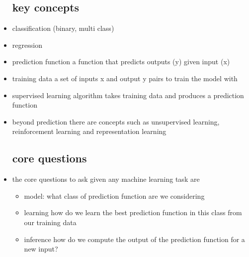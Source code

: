 \documentclass{article}
\begin{document}
\begin{itemize}
\subsection{key concepts}
\item classification (binary, multi class)
\item regression
\item prediction function a function that predicts outputs (y) given input (x)
\item training data a set of inputs x and output y pairs to train the model with
\item supervised learning algorithm takes training data and produces a prediction function 
\item beyond prediction there are concepts such as unsupervised learning, reinforcement learning and representation learning 
\subsection{core questions}
\item the core questions to ask given any machine learning task are 
\begin{itemize}
    \item model: what class of prediction function are we considering
    \item  learning how do we learn the best prediction function in this class from our training data 
    \item inference how do we compute the output of the prediction function for a new input? 
\end{itemize}

\end{itemize}
\end{document}
